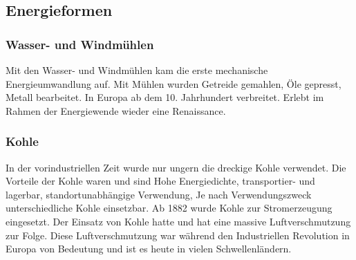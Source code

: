 \documentclass[10pt, openright=true]{scrartcl}
\begin{document}
\subsection{Energieformen}
\subsubsection{Wasser- und Windmühlen}
Mit den Wasser- und Windmühlen kam die erste mechanische Energieumwandlung auf. Mit Mühlen wurden Getreide gemahlen, Öle gepresst, Metall bearbeitet. In Europa ab dem 10. Jahrhundert verbreitet. Erlebt im Rahmen der Energiewende wieder eine Renaissance.
\subsubsection{Kohle}
In der vorindustriellen Zeit wurde nur ungern die dreckige Kohle verwendet. Die Vorteile der Kohle waren und sind Hohe Energiedichte, transportier- und lagerbar, standortunabhängige Verwendung, Je nach Verwendungszweck unterschiedliche Kohle einsetzbar. Ab 1882 wurde Kohle zur Stromerzeugung eingesetzt. Der Einsatz von Kohle hatte und hat eine massive Luftverschmutzung zur Folge. Diese Luftverschmutzung war während den Industriellen Revolution in Europa von Bedeutung und ist es heute in vielen Schwellenländern.
\end{document}
